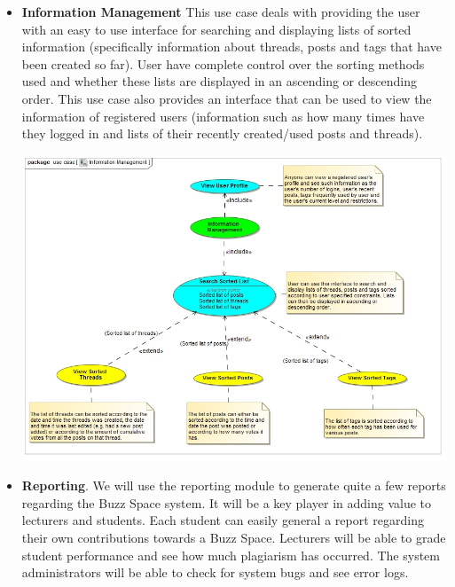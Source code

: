 \documentclass[a4paper,12pt]{report}
\begin{document}
\begin{itemize}
\begin{center}
		\end{center}
\item  \textbf{Information Management} This use case deals with providing the user with an easy to use interface for searching and displaying lists of sorted information (specifically information about threads, posts and tags that have been created so far). User have complete control over the sorting methods used and whether these lists are displayed in an ascending or descending order. This use  case also provides an interface that can be used to view the information of registered users (information such as how many times have they logged in and lists of their recently created/used posts and threads).
		\begin{center}
  	 	\includegraphics[width=1\textwidth] {../Herman/Information_Management.jpg}\\[0.4cm]    
		\end{center}
\item \textbf{Reporting}. We will use the reporting module to generate quite a few reports regarding the Buzz Space system. It will be a key player in adding value to lecturers and students. Each student can easily general a report regarding their own contributions towards a Buzz Space. Lecturers will be able to grade student performance and see how much plagiarism has occurred. The system administrators will be able to check for system bugs and see error logs. 
		\begin{center}

\end{center}
\end{itemize}
\end{document}
